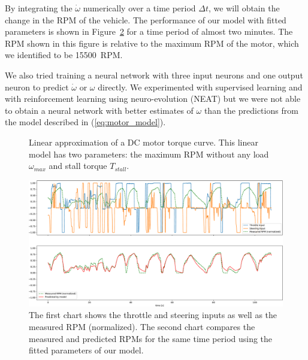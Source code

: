 By integrating the $\dot{\omega}$ numerically over a time period $\Delta t$, we will obtain the change in the RPM of the vehicle. The performance of our model with fitted parameters is shown in Figure~\ref{fig:motor_rpm_model} for a time period of almost two minutes. The \gls*{RPM} shown in this figure is relative to the maximum \gls*{RPM} of the motor, which we identified to be \SI{15500}{RPM}.

We also tried training a neural network with three input neurons and one output neuron to predict $\dot{\omega}$ or $\omega$ directly. We experimented with supervised learning and with reinforcement learning using neuro-evolution (NEAT) but we were not able to obtain a neural network with better estimates of $\omega$ than the predictions from the model described in (\ref{eq:motor_model}).

\begin{figure}
	\centering
	
	
	\caption{Linear approximation of a DC motor torque curve. This linear model has two parameters: the maximum RPM without any load $\omega_{max}$ and stall torque $T_{stall}$.}
	\label{fig:torque_rpm_curve}
\end{figure}

\begin{figure}
	\centering
	\includegraphics[width=\textwidth]{../img/fit_8000}
	\caption{The first chart shows the throttle and steering inputs as well as the measured RPM (normalized). The second chart compares the measured and predicted RPMs for the same time period using the fitted parameters of our model.}
	\label{fig:motor_rpm_model}
\end{figure}


